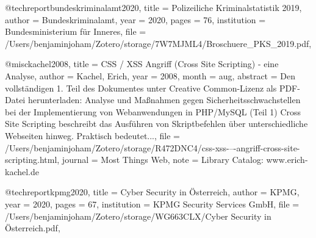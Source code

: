 
@techreport{bundeskriminalamt2020,
  title = {{Polizeiliche Kriminalstatistik 2019}},
  author = {Bundeskriminalamt},
  year = {2020},
  pages = {76},
  institution = {{Bundesministerium f{\"u}r Inneres}},
  file = {/Users/benjaminjoham/Zotero/storage/7W7MJML4/Broschuere_PKS_2019.pdf},
}

@misc{kachel2008,
  title = {{CSS / XSS \textendash{} Angriff (Cross Site Scripting) - eine Analyse}},
  author = {Kachel, Erich},
  year = {2008},
  month = aug,
  abstract = {Den vollst{\"a}ndigen 1. Teil des Dokumentes unter Creative Common-Lizenz als PDF-Datei herunterladen: Analyse und Ma{\ss}nahmen gegen Sicherheitsschwachstellen bei der Implementierung von Webanwendungen in PHP/MySQL (Teil 1) Cross Site Scripting beschreibt das Ausf{\"u}hren von Skriptbefehlen {\"u}ber unterschiedliche Webseiten hinweg. Praktisch bedeutet...},
  file = {/Users/benjaminjoham/Zotero/storage/R472DNC4/css-xss-–-angriff-cross-site-scripting.html},
  journal = {Most Things Web},
  note = {Library Catalog: www.erich-kachel.de}
}

@techreport{kpmg2020,
  title = {{Cyber Security in {\"O}sterreich}},
  author = {KPMG},
  year = {2020},
  pages = {67},
  institution = {{KPMG Security Services GmbH}},
  file = {/Users/benjaminjoham/Zotero/storage/WG663CLX/Cyber Security in Österreich.pdf},
}

